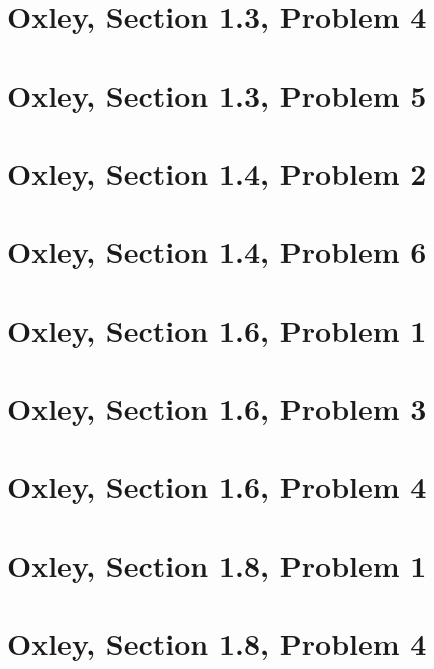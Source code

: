     \section{Oxley, Section 1.3, Problem 4}
        
        \clearpage

    \section{Oxley, Section 1.3, Problem 5}
        
        \clearpage

    \section{Oxley, Section 1.4, Problem 2}
        
        \clearpage

    \section{Oxley, Section 1.4, Problem 6}
        
        \clearpage

    \section{Oxley, Section 1.6, Problem 1}
        
        \clearpage

    \section{Oxley, Section 1.6, Problem 3}
        
        \clearpage

    \section{Oxley, Section 1.6, Problem 4}
        
        \clearpage


    \section{Oxley, Section 1.8, Problem 1}
        
        \clearpage

    \section{Oxley, Section 1.8, Problem 4}
        
        \clearpage
    